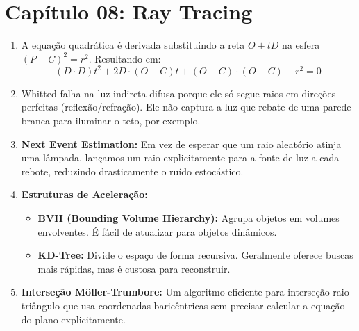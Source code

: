 \section*{Capítulo 08: Ray Tracing}
\begin{enumerate}
    \item A equação quadrática é derivada substituindo a reta $O+tD$ na esfera $(P-C)^2 = r^2$. Resultando em:
    \begin{equation}
    (D \cdot D)t^2 + 2D \cdot (O - C)t + (O - C) \cdot (O - C) - r^2 = 0
    \end{equation}
    \item Whitted falha na luz indireta difusa porque ele só segue raios em direções perfeitas (reflexão/refração). Ele não captura a luz que rebate de uma parede branca para iluminar o teto, por exemplo.
    \item \textbf{Next Event Estimation:} Em vez de esperar que um raio aleatório atinja uma lâmpada, lançamos um raio explicitamente para a fonte de luz a cada rebote, reduzindo drasticamente o ruído estocástico.
    \item \textbf{Estruturas de Aceleração:}
    \begin{itemize}
        \item \textbf{BVH (Bounding Volume Hierarchy):} Agrupa objetos em volumes envolventes. É fácil de atualizar para objetos dinâmicos.
        \item \textbf{KD-Tree:} Divide o espaço de forma recursiva. Geralmente oferece buscas mais rápidas, mas é custosa para reconstruir.
    \end{itemize}
    \item \textbf{Interseção Möller-Trumbore:} Um algoritmo eficiente para interseção raio-triângulo que usa coordenadas baricêntricas sem precisar calcular a equação do plano explicitamente.
\end{enumerate}

